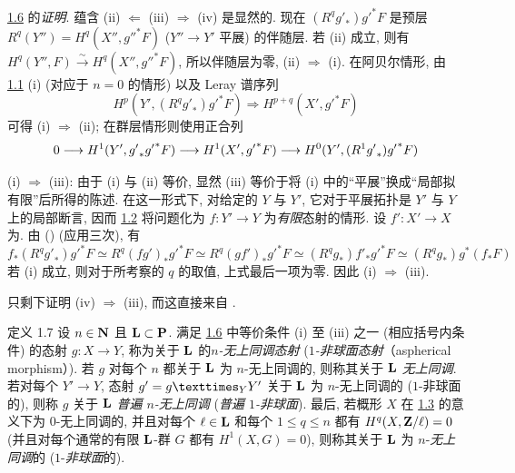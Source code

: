 \noindent
\hyperref[XV.prop1.6]{1.6} 的\emph{证明}\pageoriginale. 蕴含 (ii) $\Leftarrow$ (iii) $\Rightarrow$ (iv) 是显然的.
现在 $(R^{q}{g'}_{\ast}){g'}^{\ast}F$ 是预层 $R^{q}(Y'')=H^{q}(X'',{g''}^{\ast}F)$ ($Y''\rightarrow Y'$ 平展) 的伴随层. 若 (ii) 成立, 则有 $H^{q}(Y'',F)\xrightarrow{\sim}H^{q}(X'',{g''}^{\ast}F)$, 所以伴随层为零, \ie (ii) $\Rightarrow$ (i). 在阿贝尔情形, 由 \hyperref[XV.prop1.1]{1.1} (i) (对应于 $n=0$ 的情形) 以及 Leray 谱序列
$$
H^{p}(Y',(R^{q}{g'}_{\ast}){g'}^{\ast}F)\Longrightarrow
H^{p+q}(X',{g'}^{\ast}F)
$$
可得 (i) $\Rightarrow$ (ii); 在群层情形则使用正合列
$$
0\longrightarrow H^{1}(Y',{g'}_{\ast}{g'}^{\ast}F)\longrightarrow
H^{1}(X',{g'}^{\ast}F)\longrightarrow
H^{0}(Y',(R^{1}{g'}_{\ast}){g'}^{\ast}F){}
$$

(i) $\Rightarrow$ (iii): 由于 (i) 与 (ii) 等价, 显然 (iii) 等价于将 (i) 中的“平展”换成“局部拟有限”后所得的陈述. 在这一形式下, 对给定的 $Y$ 与 $Y'$, 它对于平展拓扑是 $Y'$ 与 $Y$ 上的局部断言, 因而 \hyperref[XV.lem1.2]{1.2} 将问题化为 $f:Y'\rightarrow Y$ 为\emph{有限}态射的情形. 设 $f':X'\rightarrow X$ 为. 由  (\resp {}) (应用三次), 有
$$
f_{\ast}(R^{q}{g'}_{\ast}){g'}^{\ast}F\simeq
R^{q}(fg')_{\ast}{g'}^{\ast}F\simeq
R^{q}(gf')_{\ast}{g'}^{\ast}F\simeq
(R^{q}g_{\ast}){f'}_{\ast}{g'}^{\ast}F\simeq
(R^{q}g_{\ast})g^{\ast}(f_{\ast}F)
$$
若 (i) 成立, 则对于所考察的 $q$ 的取值, 上式最后一项为零. 因此 (i) $\Rightarrow$ (iii).

只剩下证明 (iv) $\Rightarrow$ (iii), 而这直接\pageoriginale 来自 .

\begin{enonce*}{定义 1.7}
设 $n\in\mathbf{N}$ 且 $\mathbf{L}\subset\mathbf{P}$. 满足 \hyperref[XV.prop1.6]{1.6} 中等价条件 {\rm(i)} 至 {\rm(iii)} 之一 (\resp 相应括号内条件) 的态射 $g:X\rightarrow Y$, 称为关于 $\mathbf{L}$ 的\emph{$n$-无上同调态射} (\resp \emph{$1$-非球面态射}（aspherical morphism）). 若 $g$ 对每个 $n$ 都关于 $\mathbf{L}$ 为 $n$-无上同调的, 则称其关于 $\mathbf{L}$ \emph{无上同调}. 若对每个 $Y'\rightarrow Y$, 态射 $g'=\fprod{g}{Y'}{Y}$ 关于 $\mathbf{L}$ 为 $n$-无上同调的 (\resp $1$-非球面的), 则称 $g$ 关于 $\mathbf{L}$ \emph{普遍 $n$-无上同调} (\resp \emph{普遍 $1$-非球面}). 最后, 若概形 $X$ 在 \hyperref[XV.def1.3]{1.3} 的意义下为 $0$-无上同调的, 并且对每个 $\ell\in\mathbf{L}$ 和每个 $1\leq q\leq n$ 都有 $H^{q}(X,\mathbf{Z}/\ell)=0$ (\resp 并且对每个通常的有限 $\mathbf{L}$-群 $G$ 都有 $H^{1}(X,G)=0$), 则称其关于 $\mathbf{L}$ 为 $n$-\emph{无上同调}的 (\resp $1$-\emph{非球面}的).
\end{enonce*}


